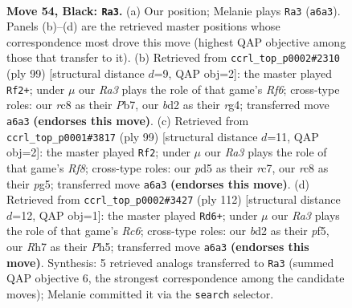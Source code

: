 \documentclass[11pt]{article}
\begin{document}
\clearpage

\begin{figure}[p]\centering
\begin{subfigure}{0.46\textwidth}\centering
\resizebox{\linewidth}{!}{%
\newchessgame
\chessboard[
  setfen={2R5/7r/r4k2/1p1P4/4K3/1p6/3B4/8 b - - 0 54},
  showmover=false,
  pgfstyle=straightmove, color=movearrow, markmove={a6-a3}
]}
\caption{}
\end{subfigure}\hfill
\begin{subfigure}{0.46\textwidth}\centering
\resizebox{\linewidth}{!}{%
\newchessgame
\chessboard[
  setfen={8/1p3k2/8/4p3/6RP/5r2/P1K5/8 b - - 2 50},
  showmover=false,
  pgfstyle=straightmove, color=movearrow, markmove={f3-f2}
]}
\caption{}
\end{subfigure}
\\[4pt]
\begin{subfigure}{0.46\textwidth}\centering
\resizebox{\linewidth}{!}{%
\newchessgame
\chessboard[
  setfen={5k2/2R5/6p1/6P1/4P1K1/8/8/5r2 b - - 0 50},
  showmover=false,
  pgfstyle=straightmove, color=movearrow, markmove={f1-f2}
]}
\caption{}
\end{subfigure}\hfill
\begin{subfigure}{0.46\textwidth}\centering
\resizebox{\linewidth}{!}{%
\newchessgame
\chessboard[
  setfen={8/4r3/P1R5/5p1P/3k1P2/3p4/5K2/8 w - - 7 57},
  showmover=false,
  pgfstyle=straightmove, color=movearrow, markmove={c6-d6}
]}
\caption{}
\end{subfigure}
\caption{\textbf{Move 54, Black: \texttt{Ra3}.} (a) Our position; Melanie plays \texttt{Ra3} (\texttt{a6a3}). Panels (b)--(d) are the retrieved master positions whose correspondence most drove this move (highest QAP objective among those that transfer to it). (b) Retrieved from \texttt{ccrl\_top\_p0002\#2310} (ply 99) [structural distance $d$=9, QAP obj=2]: the master played \texttt{Rf2+}; under $\mu$ our \emph{Ra3} plays the role of that game's \emph{Rf6}; cross-type roles: our \emph{r}c8 as their \emph{P}b7, our \emph{b}d2 as their \emph{r}g4; transferred move \texttt{a6a3} \textbf{(endorses this move)}. (c) Retrieved from \texttt{ccrl\_top\_p0001\#3817} (ply 99) [structural distance $d$=11, QAP obj=2]: the master played \texttt{Rf2}; under $\mu$ our \emph{Ra3} plays the role of that game's \emph{Rf8}; cross-type roles: our \emph{p}d5 as their \emph{r}c7, our \emph{r}c8 as their \emph{p}g5; transferred move \texttt{a6a3} \textbf{(endorses this move)}. (d) Retrieved from \texttt{ccrl\_top\_p0002\#3427} (ply 112) [structural distance $d$=12, QAP obj=1]: the master played \texttt{Rd6+}; under $\mu$ our \emph{Ra3} plays the role of that game's \emph{Rc6}; cross-type roles: our \emph{b}d2 as their \emph{p}f5, our \emph{R}h7 as their \emph{P}h5; transferred move \texttt{a6a3} \textbf{(endorses this move)}. Synthesis: 5 retrieved analogs transferred to \texttt{Ra3} (summed QAP objective 6, the strongest correspondence among the candidate moves); Melanie committed it via the \texttt{search} selector.}
\label{fig:thought-m107}
\end{figure}
\end{document}

